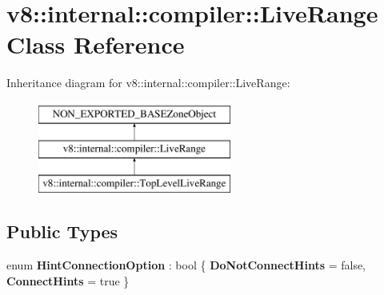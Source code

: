 \hypertarget{classv8_1_1internal_1_1compiler_1_1LiveRange}{}\section{v8\+:\+:internal\+:\+:compiler\+:\+:Live\+Range Class Reference}
\label{classv8_1_1internal_1_1compiler_1_1LiveRange}
Inheritance diagram for v8\+:\+:internal\+:\+:compiler\+:\+:Live\+Range\+:\begin{figure}[H]
\begin{center}
\leavevmode
\includegraphics[height=3.000000cm]{classv8_1_1internal_1_1compiler_1_1LiveRange}
\end{center}
\end{figure}
\subsection*{Public Types}
\begin{DoxyCompactItemize}
\item 
\mbox{\label{classv8_1_1internal_1_1compiler_1_1LiveRange_a0711a0c18403cd47392a4c34f4b7ca8d}} 
enum {\bfseries Hint\+Connection\+Option} \+: bool \{ {\bfseries Do\+Not\+Connect\+Hints} = false, 
{\bfseries Connect\+Hints} = true
 \}
\end{DoxyCompactItemize}
